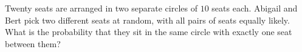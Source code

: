 Twenty seats are arranged in two separate circles of $10$ seats each. Abigail and Bert pick two different seats at random, with all pairs of seats equally likely. What is the probability that they sit in the same circle with exactly one seat between them?
